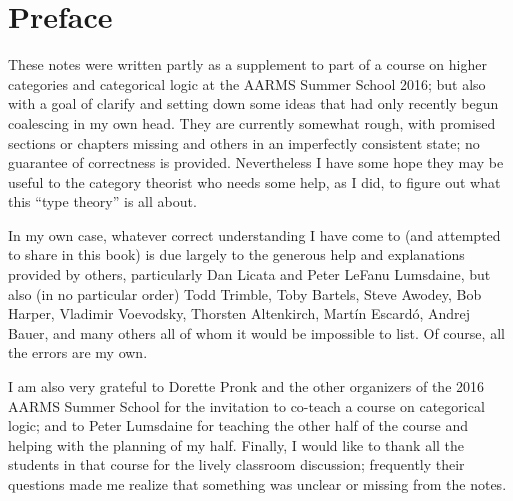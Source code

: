 \chapter{Preface}

These notes were written partly as a supplement to part of a course on higher categories and categorical logic at the AARMS Summer School 2016; but also with a goal of clarify and setting down some ideas that had only recently begun coalescing in my own head.
They are currently somewhat rough, with promised sections or chapters missing and others in an imperfectly consistent state; no guarantee of correctness is provided.
Nevertheless I have some hope they may be useful to the category theorist who needs some help, as I did, to figure out what this ``type theory'' is all about.

In my own case, whatever correct understanding I have come to (and attempted to share in this book) is due largely to the generous help and explanations provided by others, particularly Dan Licata and Peter LeFanu Lumsdaine, but also (in no particular order) Todd Trimble, Toby Bartels, Steve Awodey, Bob Harper, Vladimir Voevodsky, Thorsten Altenkirch, Mart\'in Escard\'o, Andrej Bauer, and many others all of whom it would be impossible to list.
Of course, all the errors are my own.

I am also very grateful to Dorette Pronk and the other organizers of the 2016 AARMS Summer School for the invitation to co-teach a course on categorical logic; and to Peter Lumsdaine for teaching the other half of the course and helping with the planning of my half.
Finally, I would like to thank all the students in that course for the lively classroom discussion; frequently their questions made me realize that something was unclear or missing from the notes.



